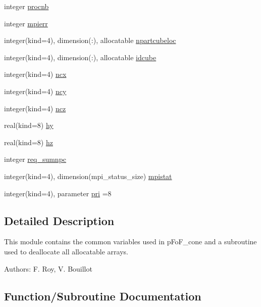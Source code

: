 \begin{DoxyCompactItemize}
\item 
integer \hyperlink{namespacemodvariables_ae51b502acd90a80a0134e81f92fbac15}{procnb}
\item 
integer \hyperlink{namespacemodvariables_ab580e2bdf8eff875402911526f873de2}{mpierr}
\item 
integer(kind=4), dimension(\+:), allocatable \hyperlink{namespacemodvariables_a32098f5e276eab031b1feebf7124f8bf}{npartcubeloc}
\item 
integer(kind=4), dimension(\+:), allocatable \hyperlink{namespacemodvariables_a22925cb23ea4a80a06b3f4b67b62102e}{idcube}
\item 
integer(kind=4) \hyperlink{namespacemodvariables_ab3c5e83108d2cc8318f235c1f889a162}{ncx}
\item 
integer(kind=4) \hyperlink{namespacemodvariables_a1c1ff1a91ab25fd963a4ce5302249978}{ncy}
\item 
integer(kind=4) \hyperlink{namespacemodvariables_ab75f9f5dd0ce07892cca908373a51ddc}{ncz}
\item 
real(kind=8) \hyperlink{namespacemodvariables_a31a775c0bcadfce141cc3cebf22df9ff}{hy}
\item 
real(kind=8) \hyperlink{namespacemodvariables_a26d18952766121089d4309f2449d8b29}{hz}
\item 
integer \hyperlink{namespacemodvariables_a64644f9282a9c19faf8ccb44b0e60877}{req\+\_\+sumnpc}
\item 
integer(kind=4), dimension(mpi\+\_\+status\+\_\+size) \hyperlink{namespacemodvariables_af6d0e7b2912dcb50b21940d5f8658be4}{mpistat}
\item 
integer(kind=4), parameter \hyperlink{namespacemodvariables_a51e0b900e05f4302a36ddf33b6df0649}{pri} =8
\end{DoxyCompactItemize}


\subsection{Detailed Description}
This module contains the common variables used in p\+Fo\+F\+\_\+cone and a subroutine used to deallocate all allocatable arrays. 

Authors\+: F. Roy, V. Bouillot 

\subsection{Function/\+Subroutine Documentation}
